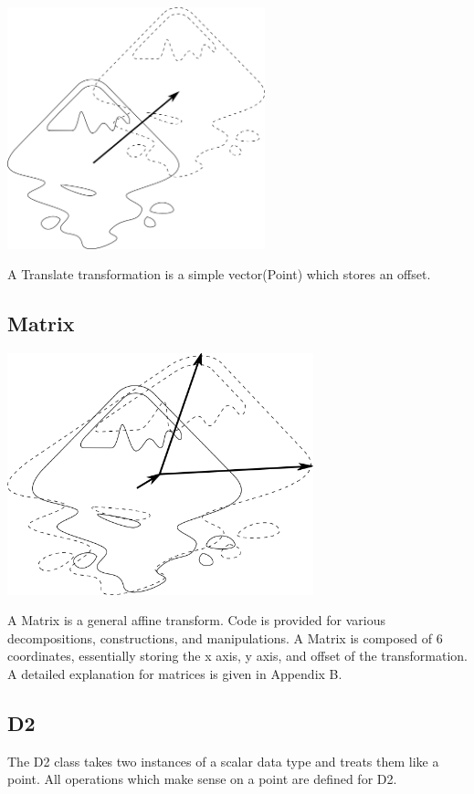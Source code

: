 \documentclass[openany]{book}
\newcommand{\code}[1]{\textsf{#1}}
\begin{document}
\includegraphics[height=70mm]{media/translate.png}

A \code{Translate} transformation is a simple vector(\code{Point})
which stores an offset.

\subsection{Matrix}

\includegraphics[height=70mm]{media/matrix.png}

A \code{Matrix} is a general affine transform.  Code is provided for
various decompositions, constructions, and manipulations.  A
\code{Matrix} is composed of 6 coordinates, essentially storing the
x axis, y axis, and offset of the transformation.  A detailed
explanation for matrices is given in Appendix B.

\subsection{D2}
The \code{D2} class takes two instances of a scalar data type and treats them like a point.  All operations which make sense on a point are defined for D2.
\end{document}
